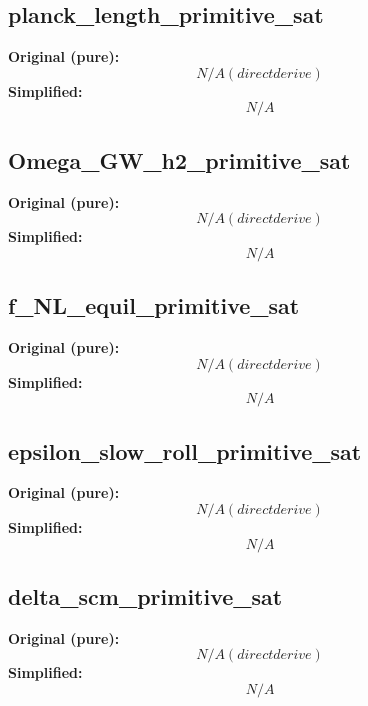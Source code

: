 \subsection{planck_length_primitive_sat}
\textbf{Original (pure):}
\begin{equation}
N/A (direct derive)
\end{equation}
\textbf{Simplified:}
\begin{equation}
N/A
\end{equation}

\subsection{Omega_GW_h2_primitive_sat}
\textbf{Original (pure):}
\begin{equation}
N/A (direct derive)
\end{equation}
\textbf{Simplified:}
\begin{equation}
N/A
\end{equation}

\subsection{f_NL_equil_primitive_sat}
\textbf{Original (pure):}
\begin{equation}
N/A (direct derive)
\end{equation}
\textbf{Simplified:}
\begin{equation}
N/A
\end{equation}

\subsection{epsilon_slow_roll_primitive_sat}
\textbf{Original (pure):}
\begin{equation}
N/A (direct derive)
\end{equation}
\textbf{Simplified:}
\begin{equation}
N/A
\end{equation}

\subsection{delta_scm_primitive_sat}
\textbf{Original (pure):}
\begin{equation}
N/A (direct derive)
\end{equation}
\textbf{Simplified:}
\begin{equation}
N/A
\end{equation}

